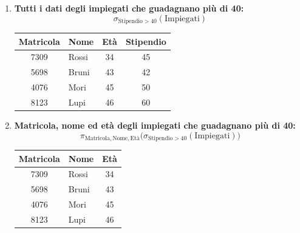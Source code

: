 \documentclass[12pt]{extarticle}
\begin{document}

\begin{enumerate}
    \item \textbf{Tutti i dati degli impiegati che guadagnano più di 40:}
    \[
    \sigma_{\text{Stipendio} > 40}(\text{Impiegati})
    \]
    \begin{center}
    \qquad
    \small
    \begin{tabular}{clcc}
        \toprule
        \textbf{Matricola} & \textbf{Nome} & \textbf{Età} & \textbf{Stipendio} \\
        \midrule
        7309 & Rossi & 34 & 45 \\
        5698 & Bruni & 43 & 42 \\
        4076 & Mori & 45 & 50 \\
        8123 & Lupi & 46 & 60 \\
        \bottomrule
    \end{tabular}
    \end{center}

    \item \textbf{Matricola, nome ed età degli impiegati che guadagnano più di 40:}
    \[
    \pi_{\text{Matricola}, \text{Nome}, \text{Età}}\big(\sigma_{\text{Stipendio} > 40}(\text{Impiegati})\big)
    \]
    \begin{center}
    \qquad
    \small
    \begin{tabular}{clc}
        \toprule
        \textbf{Matricola} & \textbf{Nome} & \textbf{Età} \\
        \midrule
        7309 & Rossi & 34 \\
        5698 & Bruni & 43 \\
        4076 & Mori & 45 \\
        8123 & Lupi & 46 \\
        \bottomrule
    \end{tabular}
    \end{center}


\end{enumerate}
\end{document}
